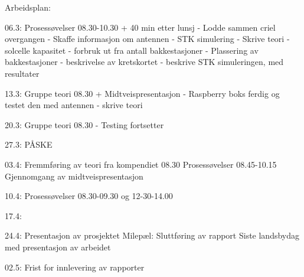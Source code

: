 
Arbeidsplan:

06.3:	
		Prosessøvelser 08.30-10.30 + 40 min etter lunsj
		- Lodde sammen criel overgangen
		- Skaffe informasjon om antennen 
		- STK simulering
		- Skrive teori 
			- solcelle kapasitet
			- forbruk ut fra antall bakkestasjoner
			- Plassering av bakkestasjoner
			- beskrivelse av kretskortet
			- beskrive STK simuleringen, med resultater

13.3:	Gruppe teori 08.30 + Midtveispresentasjon
		- Raspberry boks ferdig og testet den med antennen
		- skrive teori

20.3:   	Gruppe teori 08.30
		- Testing fortsetter

27.3: 	PÅSKE

03.4: 	Fremmføring av teori fra kompendiet 08.30
		Prosessøvelser 08.45-10.15
		Gjennomgang av midtveispresentasjon
		
10.4:	Prosessøvelser 08.30-09.30 og 12-30-14.00

17.4: 	

24.4:	Presentasjon av prosjektet
		Milepæl: Sluttføring av rapport 
		Siste landsbydag med presentasjon av arbeidet

02.5:	Frist for innlevering av rapporter	

